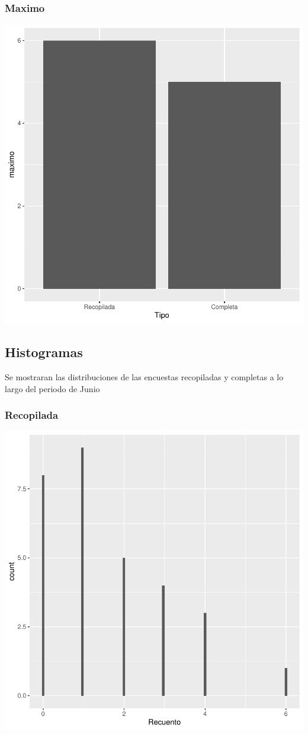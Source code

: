 \documentclass{article}
\begin{document}
\subsubsection{Maximo}

\includegraphics{seguimento2-092}

\subsection{Histogramas}
Se mostraran las distribuciones de las encuestas recopiladas y completas a lo largo del periodo de Junio

\subsubsection{Recopilada}

\includegraphics{seguimento2-093}
\end{document}
